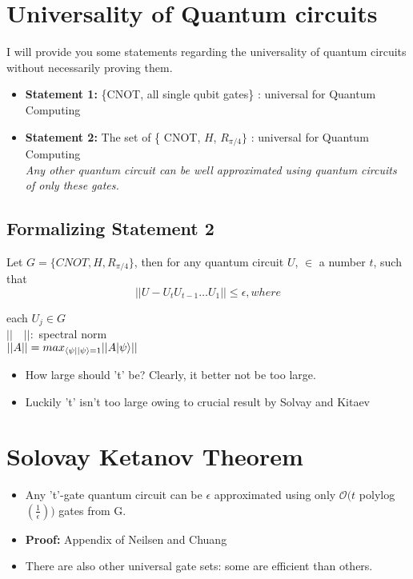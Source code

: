 \documentclass[11.5pt, paper=a4]{article}
\theoremstyle{definition}
\numberwithin{theorem}{section}
\begin{document}
\section{Universality of Quantum circuits}

I will provide you some statements regarding the universality of quantum circuits without necessarily proving them.
\begin{itemize}
    \item \textbf{Statement 1:} \{CNOT, all single qubit gates\} : universal for Quantum Computing
    \item \textbf{Statement 2:} The set of \{ CNOT, $H$, $R_{\pi/4}\}$ : universal for Quantum Computing \\
    \textit{Any other quantum circuit can be well approximated using quantum circuits of only these gates.}
\end{itemize}
\subsection{Formalizing Statement 2}
    Let $G=\{CNOT, H, R_{\pi/4}\}$, then for any quantum circuit $U$, $\in$ a number $t$, such that
    \begin{equation*}
        \lvert\lvert U - U_t U_{t-1} \ldots U_1 \rvert\rvert \leq \epsilon, where
    \end{equation*}
    \begin{center}
        each $U_j \in G$ \\ $\lvert \lvert \quad \rvert \rvert:$ spectral norm \\ $\lvert \lvert A \rvert \rvert = max_{{\left\langle{\psi}\right\vert}{\left\vert{\psi}\right\rangle}=1} \lvert \lvert A{\left\vert{\psi}\right\rangle} \rvert \rvert$
    \end{center}
    \begin{itemize}
        \item How large should 't' be? Clearly, it better not be too large.
        \item Luckily 't' isn't too large owing to crucial result by Solvay and Kitaev
    \end{itemize}
\section{Solovay Ketanov Theorem}
\begin{itemize}
    \item Any 't'-gate quantum circuit can be $\epsilon$ approximated using only $\mathcal{O}(t$ polylog$ (\frac{1}{\epsilon}))$ gates from G.
    \item \textbf{Proof:} Appendix of Neilsen and Chuang \cite{nielsen2002quantum}
    \item There are also other universal gate sets: some are efficient than others.
\end{itemize}
\end{document}
